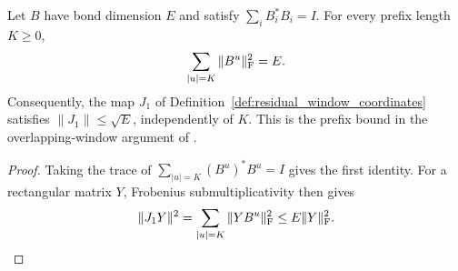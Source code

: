 \begin{lemma}
    \label{thm:residual_window_virtual_norm}
    \leanok
    Let $B$ have bond dimension $E$ and satisfy $\sum_i B_i^*B_i=I$.
    For every prefix length $K\geq0$,
    \begin{align}
        \sum_{|u|=K}\|B^u\|_{\mathrm F}^2=E.
        \notag
    \end{align}
    Consequently, the map $J_1$ of
    Definition~\ref{def:residual_window_coordinates} satisfies
    $\|J_1\|\leq\sqrt E$, independently of $K$.
    This is the prefix bound in the overlapping-window argument of
    \cite[Lemma~6.1(ii)]{Nachtergaele1996Spectral}.
\end{lemma}
\begin{proof}\leanok
    Taking the trace of $\sum_{|u|=K}(B^u)^*B^u=I$ gives the first identity.
    For a rectangular matrix $Y$, Frobenius submultiplicativity then gives
    \begin{align}
        \|J_1Y\|^2=\sum_{|u|=K}\|YB^u\|_{\mathrm F}^2
        \leq E\|Y\|_{\mathrm F}^2.
        \notag
    \end{align}
\end{proof}

